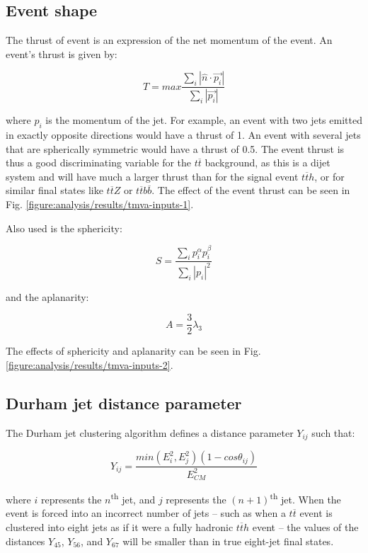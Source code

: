 \subsection{Event shape}
The thrust of event is an expression of the net momentum of the event. An event's thrust is given by:

\begin{equation}
	T = max \frac{\sum_i | \hat{n} \cdot \overrightarrow{p_i} |}{\sum_i | \overrightarrow{p_i} |}
\label{eq:thrust}
\end{equation}

where $p_i$ is the momentum of the jet. For example, an event with two jets emitted in exactly opposite directions would have a thrust of 1. An event with several jets that are spherically symmetric would have a thrust of 0.5. The event thrust is thus a good discriminating variable for the $t\overline{t}$ background, as this is a dijet system and will have much a larger thrust than for the signal event $t\overline{t}h$, or for similar final states like $t\overline{t}Z$ or $t\overline{t}b\overline{b}$. The effect of the event thrust can be seen in Fig. \ref{figure:analysis/results/tmva-inputs-1}.

Also used is the sphericity:

\begin{equation}
	S = \frac{\sum_i p_i^{\alpha} p_i^{\beta}}{\sum_i | p_i |^2}
\label{eq:sphericity}
\end{equation}

and the aplanarity:

\begin{equation}
	A = \frac{3}{2}\lambda_3
\label{eq:aplanarity}
\end{equation}

The effects of sphericity and aplanarity can be seen in Fig. \ref{figure:analysis/results/tmva-inputs-2}.

\subsection{Durham jet distance parameter}
The Durham jet clustering algorithm defines a distance parameter $Y_{ij}$ such that:

\begin{equation}
	Y_{ij} = \frac{min(E_i^2 , E_j^2)(1-cos\theta_{ij})}{E^2_{CM}}
\label{eq:durham-distance}
\end{equation}

where $i$ represents the $n$\textsuperscript{th} jet, and $j$ represents the $(n+1)$\textsuperscript{th} jet. When the event is forced into an incorrect number of jets -- such as when a $t\overline{t}$ event is clustered into eight jets as if it were a fully hadronic $t\overline{t}h$ event -- the values of the distances $Y_{45}$, $Y_{56}$, and $Y_{67}$ will be smaller than in true eight-jet final states. 

